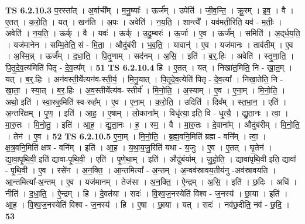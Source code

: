 \documentclass[17pt]{extarticle}
\begin{document}
                  \newline
                                \textbf{ TS 6.2.10.3} \newline
                  प॒रस्ता᳚त् । अ॒र्वाची᳚म् । म॒नु॒ष्याः᳚ । ऊर्ज᳚म् । उपेति॑ । जी॒व॒न्ति॒ । क्रू॒रम् । इ॒व॒ । वै । ए॒तत् । क॒रो॒ति॒ । यत् । खन॑ति । अ॒पः । अवेति॑ । न॒य॒ति॒ । शान्त्यै᳚ । यव॑मती॒रिति॒ यव॑ - म॒तीः॒ । अवेति॑ । न॒य॒ति॒ । ऊर्क् । वै । यवः॑ । ऊर्क् । उ॒दु॒म्बरः॑ । ऊ॒र्जा । ए॒व । ऊर्ज᳚म् । समिति॑ । अ॒द्‌र्ध॒य॒ति॒ । यज॑मानेन । सम्मि॒तेति॒ सं - मि॒ता॒ । औदु॑बंरी । भ॒व॒ति॒ । यावान्॑ । ए॒व । यज॑मानः । ताव॑तीम् । ए॒व । अ॒स्मि॒न्न् । ऊर्ज᳚म् । द॒धा॒ति॒ । पि॒तृ॒णाम् । सद॑नम् । अ॒सि॒ । इति॑ । ब॒र्॒.हिः । अवेति॑ । स्तृ॒णा॒ति॒ । पि॒तृ॒दे॒व॒त्य॑मिति॑ पितृ - दे॒व॒त्य᳚म् । \textbf{  51} \newline
                  \newline
                                \textbf{ TS 6.2.10.4} \newline
                  हि । ए॒तत् । यत् । निखा॑त॒मिति॒ नि - खा॒त॒म् । यत् । ब॒र्॒.हिः । अन॑वस्ती॒र्येत्यन॑व-स्ती॒र्य॒ । मि॒नु॒यात् । पि॒तृ॒दे॒व॒त्येति॑ पितृ - दे॒व॒त्या᳚ । निखा॒तेति॒ नि - खा॒ता॒ । स्या॒त् । ब॒र॒.हिः । अ॒व॒स्तीर्येत्य॑व- स्तीर्य॑ । मि॒नो॒ति॒ । अ॒स्याम् । ए॒व । ए॒ना॒म् । मि॒नो॒ति॒ । अथो॒ इति॑ । स्वा॒रुह॒मिति॑ स्व-रुह᳚म् । ए॒व । ए॒ना॒म् । क॒रो॒ति॒ । उदिति॑ । दिव᳚म् । स्त॒भा॒न॒ । एति॑ । अ॒न्तरि॑क्षम् । पृ॒ण॒ । इति॑ । आ॒ह॒ । ए॒षाम् । लो॒काना᳚म् । विधृ॑त्या॒ इति॒ वि - धृ॒त्यै॒ । द्यु॒ता॒नः । त्वा॒ । मा॒रु॒तः । मि॒नो॒तु॒ । इति॑ । आ॒ह॒ । द्यु॒ता॒नः । ह॒ । स्म॒ । वै । मा॒रु॒तः । दे॒वाना᳚म् । औदु॑बंरीम् । मि॒नो॒ति॒ । तेन॑ । ए॒व । \textbf{  52} \newline
                  \newline
                                \textbf{ TS 6.2.10.5} \newline
                  ए॒ना॒म् । मि॒नो॒ति॒ । ब्र॒ह्म॒वनि॒मिति॑ ब्रह्म - वनि᳚म् । त्वा॒ । क्ष॒त्र॒वनि॒मिति॑ क्षत्र - वनि᳚म् । इति॑ । आ॒ह॒ । य॒था॒य॒जु॒रिति॑ यथा - य॒जुः । ए॒व । ए॒तत् । घृ॒तेन॑ । द्या॒वा॒पृ॒थि॒वी॒ इति॑ द्यावा-पृ॒थि॒वी॒ । एति॑ । पृ॒णे॒था॒म् । इति॑ । औदु॑बंर्याम् । जु॒हो॒ति॒ । द्यावा॑पृथि॒वी इति॒ द्यावा᳚ - पृ॒थि॒वी । ए॒व । रसे॑न । अ॒न॒क्ति॒ । आ॒न्तमित्या᳚ - अ॒न्तम् । अ॒न्वव॑स्रावय॒तीय॑नु -अव॑स्रावयति । आ॒न्तमित्या᳚-अ॒न्तम् । ए॒व । यज॑मानम् । तेज॑सा । अ॒न॒क्ति॒ । ऐ॒न्द्रम् । अ॒सि॒ । इति॑ । छ॒दिः । अधि॑ । नीति॑ । द॒धा॒ति॒ । ऐ॒न्द्रम् । हि । दे॒वत॑या । सदः॑ । वि॒श्व॒ज॒नस्येति॑ विश्व - ज॒नस्य॑ । छा॒या । इति॑ । आ॒ह॒ । वि॒श्व॒ज॒नस्येति॑ विश्व - ज॒नस्य॑ । हि । ए॒षा । छा॒या । यत् । सदः॑ । नव॑छ॒दीति॒ नव॑ - छ॒दि॒ । \textbf{  53} \newline
\end{document}
